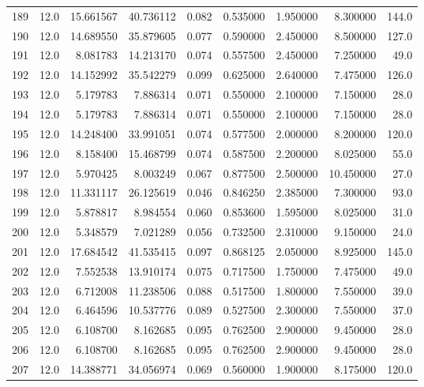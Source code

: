 \begin{tabular}{lrrrrrrrr}
189  &   12.0 &  15.661567 &  40.736112 &  0.082 &  0.535000 &  1.950000 &   8.300000 &  144.0 \\
190  &   12.0 &  14.689550 &  35.879605 &  0.077 &  0.590000 &  2.450000 &   8.500000 &  127.0 \\
191  &   12.0 &   8.081783 &  14.213170 &  0.074 &  0.557500 &  2.450000 &   7.250000 &   49.0 \\
192  &   12.0 &  14.152992 &  35.542279 &  0.099 &  0.625000 &  2.640000 &   7.475000 &  126.0 \\
193  &   12.0 &   5.179783 &   7.886314 &  0.071 &  0.550000 &  2.100000 &   7.150000 &   28.0 \\
194  &   12.0 &   5.179783 &   7.886314 &  0.071 &  0.550000 &  2.100000 &   7.150000 &   28.0 \\
195  &   12.0 &  14.248400 &  33.991051 &  0.074 &  0.577500 &  2.000000 &   8.200000 &  120.0 \\
196  &   12.0 &   8.158400 &  15.468799 &  0.074 &  0.587500 &  2.200000 &   8.025000 &   55.0 \\
197  &   12.0 &   5.970425 &   8.003249 &  0.067 &  0.877500 &  2.500000 &  10.450000 &   27.0 \\
198  &   12.0 &  11.331117 &  26.125619 &  0.046 &  0.846250 &  2.385000 &   7.300000 &   93.0 \\
199  &   12.0 &   5.878817 &   8.984554 &  0.060 &  0.853600 &  1.595000 &   8.025000 &   31.0 \\
200  &   12.0 &   5.348579 &   7.021289 &  0.056 &  0.732500 &  2.310000 &   9.150000 &   24.0 \\
201  &   12.0 &  17.684542 &  41.535415 &  0.097 &  0.868125 &  2.050000 &   8.925000 &  145.0 \\
202  &   12.0 &   7.552538 &  13.910174 &  0.075 &  0.717500 &  1.750000 &   7.475000 &   49.0 \\
203  &   12.0 &   6.712008 &  11.238506 &  0.088 &  0.517500 &  1.800000 &   7.550000 &   39.0 \\
204  &   12.0 &   6.464596 &  10.537776 &  0.089 &  0.527500 &  2.300000 &   7.550000 &   37.0 \\
205  &   12.0 &   6.108700 &   8.162685 &  0.095 &  0.762500 &  2.900000 &   9.450000 &   28.0 \\
206  &   12.0 &   6.108700 &   8.162685 &  0.095 &  0.762500 &  2.900000 &   9.450000 &   28.0 \\
207  &   12.0 &  14.388771 &  34.056974 &  0.069 &  0.560000 &  1.900000 &   8.175000 &  120.0 \\

\end{tabular}
